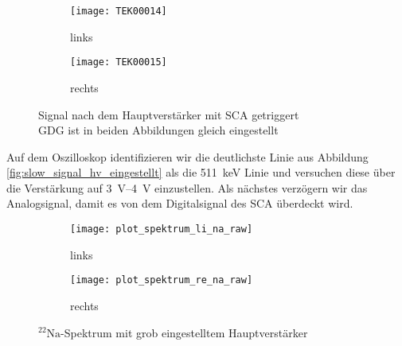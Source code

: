 \documentclass[11pt, ngerman, fleqn, DIV=15, headinclude, BCOR=2cm]{scrreprt}
\begin{document}
\begin{figure}[htbp]
	\centering
	\begin{subfigure}{0.49 \textwidth}
		\texttt{[image: TEK00014]}
		\caption{%
			links
		}
		\label{fig:slow_signal_sca_trig-li}
	\end{subfigure}
	\begin{subfigure}{0.49 \textwidth}
		\texttt{[image: TEK00015]}
		\caption{%
			rechts
		}
		\label{fig:slow_signal_sca_trig-re}
	\end{subfigure}
	\caption{%
		Signal nach dem Hauptverstärker mit SCA getriggert\\
		GDG ist in beiden Abbildungen gleich eingestellt
	}
	\label{fig:slow_signal_sca_trig}
\end{figure}

Auf dem Oszilloskop identifizieren wir die deutlichste Linie aus Abbildung
\ref{fig:slow_signal_hv_eingestellt} als die \SI{511}{\kilo\electronvolt}
Linie und versuchen diese über die Verstärkung auf \SIrange{3}{4}{\volt}
einzustellen. Als nächstes verzögern wir das Analogsignal, damit es von dem
Digitalsignal des SCA überdeckt wird.

\begin{figure}[htbp]
	\centering
	\begin{subfigure}{0.49 \textwidth}
		\texttt{[image: plot\_spektrum\_li\_na\_raw]}
		\caption{%
			links
		}
		\label{fig:slow_signal_sca_trig-li_plot}
	\end{subfigure}
	\begin{subfigure}{0.49 \textwidth}
		\texttt{[image: plot\_spektrum\_re\_na\_raw]}
		\caption{%
			rechts
		}
		\label{fig:slow_signal_sca_trig-re_plot}
	\end{subfigure}
	\caption{%
		$^{22}\text{Na}$-Spektrum mit grob eingestelltem
		Hauptverstärker
	}
	\label{fig:slow_signal_sca_trig_plot}
\end{figure}
\end{document}
